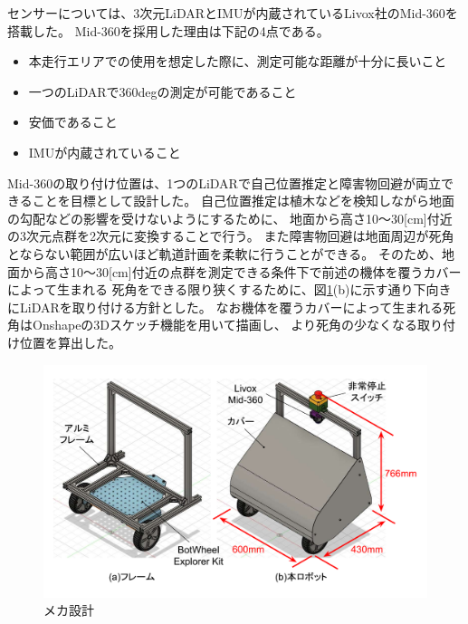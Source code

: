 \documentclass[twocolumn,9pt]{jsproceedings}
\begin{document}
センサーについては、3次元LiDARとIMUが内蔵されているLivox社のMid-360を搭載した。
Mid-360を採用した理由は下記の4点である。

\begin{itemize}
  \item[1] 本走行エリアでの使用を想定した際に、測定可能な距離が十分に長いこと
  \item[2] 一つのLiDARで360degの測定が可能であること
  \item[3] 安価であること
  \item[4] IMUが内蔵されていること
\end{itemize}

Mid-360の取り付け位置は、1つのLiDARで自己位置推定と障害物回避が両立できることを目標として設計した。
自己位置推定は植木などを検知しながら地面の勾配などの影響を受けないようにするために、
地面から高さ10〜30[cm]付近の3次元点群を2次元に変換することで行う。
また障害物回避は地面周辺が死角とならない範囲が広いほど軌道計画を柔軟に行うことができる。
そのため、地面から高さ10〜30[cm]付近の点群を測定できる条件下で前述の機体を覆うカバーによって生まれる
死角をできる限り狭くするために、図\ref{fig:trainee_flame}(b)に示す通り下向きにLiDARを取り付ける方針とした。
なお機体を覆うカバーによって生まれる死角はOnshapeの3Dスケッチ機能を用いて描画し、
より死角の少なくなる取り付け位置を算出した。


\begin{figure}[h]
  \begin{center}
    \includegraphics[width=1.0\linewidth]{figs/robot_flame.pdf}
    \caption{メカ設計}
    \label{fig:trainee_flame}
  \end{center}
\end{figure}
\end{document}
